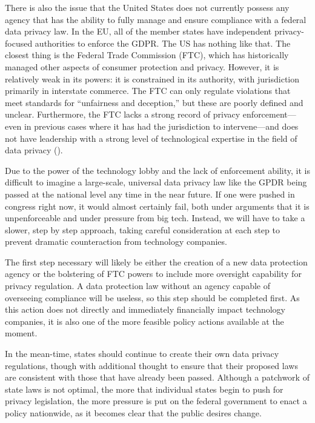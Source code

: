 \documentclass[water,article,submit,moreauthors,pdftex]{mdpi}
\begin{document}
There is also the issue that the United States does not currently
possess any agency that has the ability to fully manage and ensure
compliance with a federal data privacy law. In the EU, all of the member
states have independent privacy-focused authorities to enforce the GDPR.
The US has nothing like that. The closest thing is the Federal Trade
Commission (FTC), which has historically managed other aspects of
consumer protection and privacy. However, it is relatively weak in its
powers: it is constrained in its authority, with jurisdiction primarily
in interstate commerce. The FTC can only regulate violations that meet
standards for ``unfairness and deception,'' but these are poorly defined
and unclear. Furthermore, the FTC lacks a strong record of privacy
enforcement---even in previous cases where it has had the jurisdiction
to intervene---and does not have leadership with a strong level of
technological expertise in the field of data privacy
(\citet{new-america}).

Due to the power of the technology lobby and the lack of enforcement
ability, it is difficult to imagine a large-scale, universal data
privacy law like the GPDR being passed at the national level any time in
the near future. If one were pushed in congress right now, it would
almost certainly fail, both under arguments that it is unpenforceable
and under pressure from big tech. Instead, we will have to take a
slower, step by step approach, taking careful consideration at each step
to prevent dramatic counteraction from technology companies.

The first step necessary will likely be either the creation of a new
data protection agency or the bolstering of FTC powers to include more
oversight capability for privacy regulation. A data protection law
without an agency capable of overseeing compliance will be useless, so
this step should be completed first. As this action does not directly
and immediately financially impact technology companies, it is also one
of the more feasible policy actions available at the moment.

In the mean-time, states should continue to create their own data
privacy regulations, though with additional thought to ensure that their
proposed laws are consistent with those that have already been passed.
Although a patchwork of state laws is not optimal, the more that
individual states begin to push for privacy legislation, the more
pressure is put on the federal government to enact a policy nationwide,
as it becomes clear that the public desires change.
\end{document}
